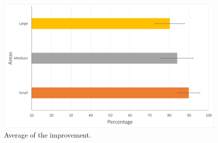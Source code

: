 \begin{figure}[H]\centering
	\includegraphics[width=1.0\textwidth]{Pictures/Performance Averages.png}%
	\caption{Average of the improvement.}\label{fig:Performance Averages}%
	
\end{figure}


